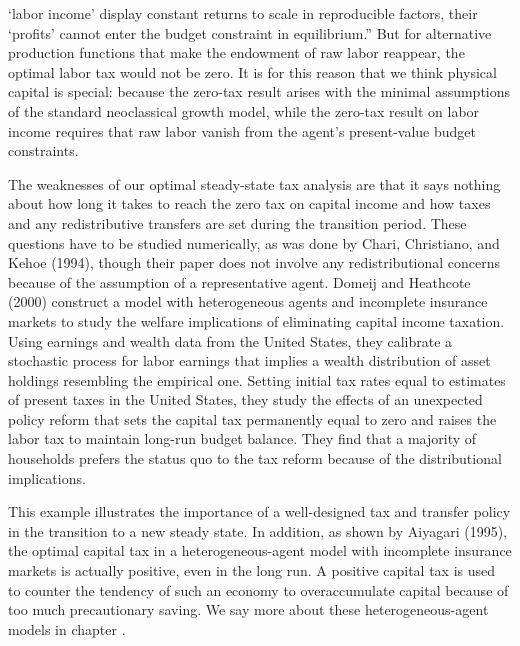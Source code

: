 `labor income' display constant returns to scale in
reproducible factors, their `profits' cannot enter the
budget constraint in equilibrium.'' But for alternative production
functions that make the endowment of raw labor reappear,
the optimal labor tax
would not be zero. It is for this reason that we think physical
capital is special: because the zero-tax result arises with
the minimal assumptions of the standard neoclassical growth
model, while the zero-tax result on labor income requires
that raw labor vanish from the agent's present-value
budget constraints.

  
 
The weaknesses of our optimal steady-state tax analysis
are that it says nothing about how long it takes to reach
the zero tax on capital income and how taxes and
any redistributive transfers are set during the transition
period. These questions have to be studied numerically,
as was done by Chari, Christiano, and Kehoe (1994),
though their paper does not involve any redistributional
concerns because of the assumption of a representative agent.
Domeij and Heathcote (2000)
construct a model with heterogeneous agents and incomplete
insurance markets to study the welfare implications
of eliminating capital income taxation.
Using earnings and wealth data from the United States,
they calibrate a stochastic process for labor earnings
that implies a wealth distribution of asset holdings
resembling the empirical one. Setting initial tax rates
equal to estimates of present taxes in the United States,
they study the effects of an unexpected policy reform
that sets the capital tax permanently equal to zero and
raises the labor tax to maintain long-run budget balance.
They find that a majority of households prefers
the  status quo to the tax reform because of the
distributional implications.

This example illustrates
the importance of a well-designed tax and transfer policy in the
transition to a new steady state.  In addition, as shown by Aiyagari (1995),
the optimal capital tax in a heterogeneous-agent model with incomplete
insurance markets is actually positive, even in the long run.
A positive capital tax is used to counter the tendency of
such an economy to overaccumulate capital because of too much
precautionary saving. We say  more about these heterogeneous-agent
models in chapter .%

